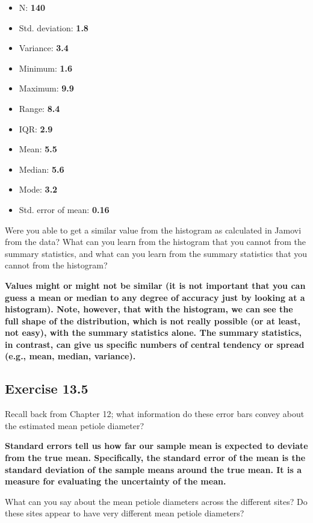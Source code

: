 \documentclass[
  openany]{krantz}
\providecommand{\tightlist}{%
  \setlength{\itemsep}{0pt}\setlength{\parskip}{0pt}}
\begin{document}
\begin{itemize}
\tightlist
\item
  N: \textbf{140}
\item
  Std. deviation: \textbf{1.8}
\item
  Variance: \textbf{3.4}
\item
  Minimum: \textbf{1.6}
\item
  Maximum: \textbf{9.9}
\item
  Range: \textbf{8.4}
\item
  IQR: \textbf{2.9}
\item
  Mean: \textbf{5.5}
\item
  Median: \textbf{5.6}
\item
  Mode: \textbf{3.2}
\item
  Std. error of mean: \textbf{0.16}
\end{itemize}

Were you able to get a similar value from the histogram as calculated in Jamovi from the data? What can you learn from the histogram that you cannot from the summary statistics, and what can you learn from the summary statistics that you cannot from the histogram?

\textbf{Values might or might not be similar (it is not important that you can guess a mean or median to any degree of accuracy just by looking at a histogram). Note, however, that with the histogram, we can see the full shape of the distribution, which is not really possible (or at least, not easy), with the summary statistics alone. The summary statistics, in contrast, can give us specific numbers of central tendency or spread (e.g., mean, median, variance).}

\hypertarget{exercise-13.5}{%
\subsection{Exercise 13.5}\label{exercise-13.5}}

Recall back from Chapter 12; what information do these error bars convey about the estimated mean petiole diameter?

\textbf{Standard errors tell us how far our sample mean is expected to deviate from the true mean. Specifically, the standard error of the mean is the standard deviation of the sample means around the true mean. It is a measure for evaluating the uncertainty of the mean.}

What can you say about the mean petiole diameters across the different sites? Do these sites appear to have very different mean petiole diameters?
\end{document}

